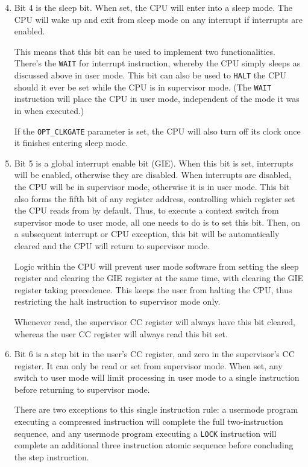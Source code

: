 \documentclass{gqtekspec}
\begin{document}
\begin{enumerate}
	\setcounter{enumi}{3}
\item Bit 4 is the sleep bit.  When set, the CPU will enter into a sleep mode.
	The CPU will wake up and exit from sleep mode on any
	interrupt if interrupts are enabled.

	This means that this bit can be used to implement two functionalities.
	There's the {\tt WAIT} for interrupt instruction, whereby the CPU
	simply sleeps as discussed above in user mode.  This bit can also be
	used to {\tt HALT} the CPU should it ever be set while the CPU is in
	supervisor mode.  (The {\tt WAIT} instruction will place the CPU in
	user mode, independent of the mode it was in when executed.)

	If the {\tt OPT\_CLKGATE} parameter is set, the CPU will also turn off
	its clock once it finishes entering sleep mode.

\item Bit 5 is a global interrupt enable bit (GIE).
	When this bit is set, interrupts will be enabled, otherwise they are
	disabled.  When interrupts are disabled, the CPU will be in supervisor
	mode, otherwise it is in user mode.  This bit also forms the fifth bit
	of any register address, controlling which register set the CPU reads
	from by default.  Thus, to execute a context switch from supervisor
	mode to user mode, all one needs to do is to set this bit.  Then, on
	a subsequent interrupt or CPU exception, this bit will be automatically
	cleared and the CPU will return to supervisor mode.

	Logic within the CPU will prevent user mode software from setting
	the sleep register and clearing the GIE register at the same time,
	with clearing the GIE register taking precedence.  This keeps the
	user from halting the CPU, thus restricting the halt instruction to
	supervisor mode only.

	Whenever read, the supervisor CC register will always have this bit
	cleared, whereas the user CC register will always read this bit set.

\item Bit 6 is a step bit in the user's CC register, and zero in the
	supervisor's CC register.  It can only be read or set from supervisor
	mode.  When set, any switch to user mode will limit processing in user
	mode to a single instruction before returning to supervisor mode.

	There are two exceptions to this single instruction rule: a usermode
	program executing a compressed instruction will complete the full
	two-instruction sequence, and any usermode program executing a
	{\tt LOCK} instruction will complete an additional three instruction
	atomic sequence before concluding the step instruction.


\end{enumerate}
\end{document}
